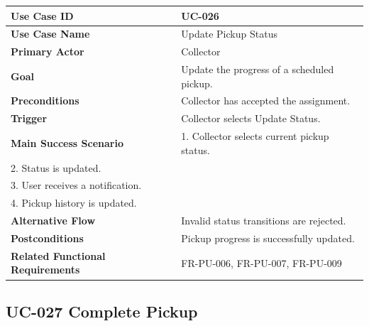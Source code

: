 \begin{longtable}{|p{4cm}|p{10cm}|}

\hline
\textbf{Use Case ID} &
UC-026 \\
\hline

\textbf{Use Case Name} &
Update Pickup Status \\
\hline

\textbf{Primary Actor} &
Collector \\
\hline

\textbf{Goal} &
Update the progress of a scheduled pickup. \\
\hline

\textbf{Preconditions} &
Collector has accepted the assignment. \\
\hline

\textbf{Trigger} &
Collector selects Update Status. \\
\hline

\textbf{Main Success Scenario} &
1. Collector selects current pickup status.\\
2. Status is updated.\\
3. User receives a notification.\\
4. Pickup history is updated.\\
\hline

\textbf{Alternative Flow} &
Invalid status transitions are rejected.\\
\hline

\textbf{Postconditions} &
Pickup progress is successfully updated.\\
\hline

\textbf{Related Functional Requirements} &
FR-PU-006, FR-PU-007, FR-PU-009 \\
\hline

\end{longtable}

\subsection{UC-027 Complete Pickup}

